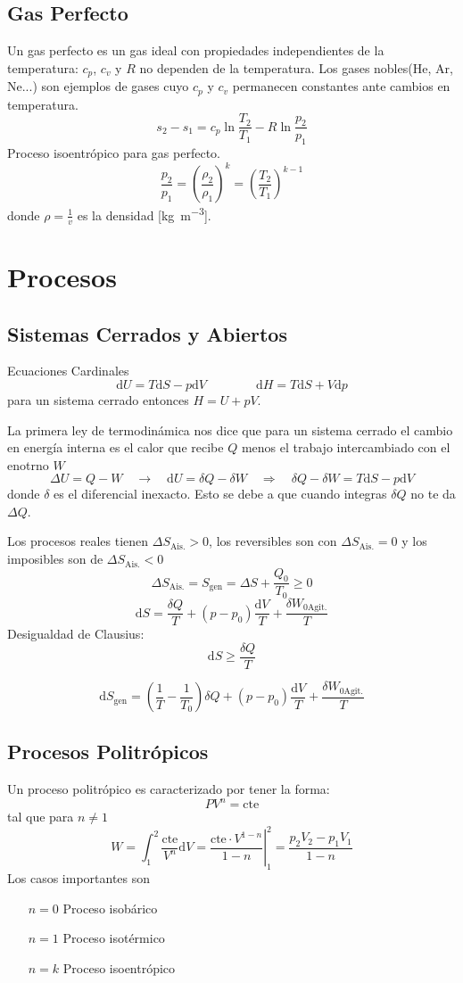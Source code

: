 \documentclass{article}
\newcommand{\ctegas}{k}
\newcommand{\cte}{\textrm{cte}}
\newcommand{\cp}{c_{p}}
\newcommand{\cv}{c_{v}}
\newcommand{\agitacion}{\textrm{Agit.}}
\newcommand{\Sgen}{S_{\textrm{gen}}}
\newcommand{\sib}[1]{[\si{#1}]}
\newcommand{\aislado}{\textrm{Ais.}}
\newcommand{\di}{\textrm{d}}
\begin{document}
\subsection{Gas Perfecto}
Un gas perfecto es un gas ideal con propiedades independientes de la temperatura: $\cp$, $\cv$ y $R$ no dependen de la temperatura. Los gases nobles(He, Ar, Ne...) son ejemplos de gases cuyo $\cp$ y $\cv$ permanecen constantes ante cambios en temperatura.
\[
s_2 -s_1 = \cp \ln \frac{T_2}{T_1} - R \ln \frac{p_2}{p_1}
\]
Proceso isoentrópico para gas perfecto.
\[
\frac{p_2}{p_1} = \left(\frac{\rho_2}{\rho_1}\right)^\ctegas = \left( \frac{T_2}{T_1}\right)^{\ctegas-1}
\]
donde $\rho=\frac{1}{v}$ es la densidad \sib{\kilogram \per \meter \cubed}.
\section{Procesos}
\subsection{Sistemas Cerrados y Abiertos}
Ecuaciones Cardinales
\begin{equation}
    \di U = T\di S - p\di V \qquad \qquad \di H = T\di S +V \di p
\end{equation}
para un sistema cerrado entonces $H = U+pV$.

La primera ley de termodinámica nos dice que para un sistema cerrado el cambio en energía interna es el calor que recibe $Q$ menos el trabajo intercambiado con el enotrno $W$ 
\[
\Delta U = Q-W \quad \rightarrow \quad \di U =\delta Q - \delta W \quad \Rightarrow\quad \delta Q -\delta W = T\di S - p\di V
\]
donde $\delta$ es el diferencial inexacto. Esto se debe a que cuando integras $\delta Q$ no te da $\Delta Q$.

Los procesos reales tienen $\Delta S_\aislado > 0$, los reversibles son con $\Delta S_\aislado = 0$ y los imposibles son de $\Delta S_\aislado < 0$
\[
\Delta S_{\aislado}=\Sgen = \Delta S + \frac{Q_0}{T_0}\geq 0
\]
\[
\di S = \frac{\delta Q}{T} + (p-p_0)\frac{\di V}{T} +\frac{\delta W_{0\agitacion}}{T} %
\]
Desigualdad de Clausius:
\[
\di S \geq \frac{\delta Q}{T}
\]

\[
\di \Sgen = \left( \frac{1}{T}- \frac{1}{T_0}\right) \delta Q + (p-p_0)\frac{\di V}{T} + \frac{\delta W_{0\agitacion}}{T}
\]

\subsection{Procesos Politrópicos}
Un proceso politrópico es caracterizado por tener la forma:
\[
PV^n = \cte
\]
tal que para $n\neq 1$
\[
W= \int^2_1\frac{\cte}{V^n}\di V =\left. \frac{\cte \cdot V^{1-n}}{1-n}\right|_{1}^2 = \frac{p_2V_2-p_1V_1}{1-n}
\]
Los casos importantes son
\begin{itemize}
    \item[$n=0$] Proceso isobárico
    \item[$n=1$] Proceso isotérmico
    \item[$n=k$] Proceso isoentrópico
\end{itemize}
\clearpage
\end{document}
